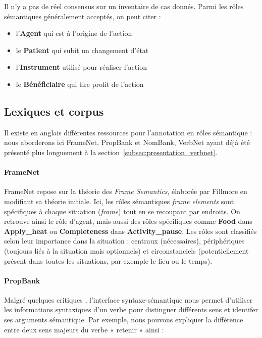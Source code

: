 Il n'y a pas de réel consensus sur un inventaire de cas donnés. Parmi les rôles
sémantiques généralement acceptés, on peut citer :

\begin{itemize}
    \item l'\textbf{Agent} qui est à l'origine de l'action
    \item le \textbf{Patient} qui subit un changement d'état
    \item l'\textbf{Instrument} utilisé pour réaliser l'action
    \item le \textbf{Bénéficiaire} qui tire profit de l'action
\end{itemize}

\subsection{Lexiques et corpus}

Il existe en anglais différentes ressources pour l'annotation en rôles
sémantique : nous aborderons ici FrameNet, PropBank et NomBank, VerbNet ayant
déjà été présenté plus longuement à la
section~\ref{subsec:presentation_verbnet}. 

\paragraph{FrameNet}

FrameNet \citep{baker1998berkeley} repose sur la théorie des \textit{Frame
Semantics}, élaborée par Fillmore en modifiant sa théorie initiale. Ici, les
rôles sémantiques \textit{frame elements} sont spécifiques à chaque situation
(\textit{frame}) tout en se recoupant par endroits. On retrouve ainsi le rôle
d'agent, mais aussi des rôles spécifiques comme \textbf{Food} dans
\textbf{Apply\_heat} ou \textbf{Completeness} dans \textbf{Activity\_pause}.
Les rôles sont classifiés selon leur importance dans la situation : centraux
(nécessaires), périphériques (toujours liés à la situation mais optionnels) et
circonstanciels (potentiellement présent dans toutes les situations, par
exemple le lieu ou le temps).

\paragraph{PropBank}

Malgré quelques critiques \citep{riemer2011conception}, l'interface
syntaxe-sémantique nous permet d'utiliser les informations syntaxiques d'un
verbe pour distinguer différents sens et identifer ses arguments sémantique.
Par exemple, nous pouvons expliquer la différence entre deux sens majeurs du
verbe « retenir » ainsi :

